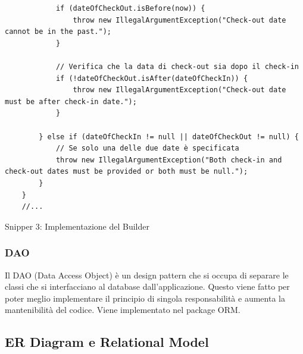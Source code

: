 \documentclass[10pt]{article}
\begin{document}
\begin{lstlisting}
            if (dateOfCheckOut.isBefore(now)) {
                throw new IllegalArgumentException("Check-out date cannot be in the past.");
            }

            // Verifica che la data di check-out sia dopo il check-in
            if (!dateOfCheckOut.isAfter(dateOfCheckIn)) {
                throw new IllegalArgumentException("Check-out date must be after check-in date.");
            }

        } else if (dateOfCheckIn != null || dateOfCheckOut != null) {
            // Se solo una delle due date è specificata
            throw new IllegalArgumentException("Both check-in and check-out dates must be provided or both must be null.");
        }
    }
    //...
\end{lstlisting}
\begin{center}
Snipper 3: Implementazione del Builder
\end{center}
\par\medskip
\label{daosec}
\subsubsection{DAO}

Il DAO (Data Access Object) \`e un design pattern che si occupa di separare le classi che si interfacciano al database dall'applicazione. Questo viene fatto
per poter meglio implementare il principio di singola responsabilit\`a e aumenta
la mantenibilità del codice. Viene implementato nel package ORM.

\subsection{ER Diagram e Relational Model}
\end{document}
